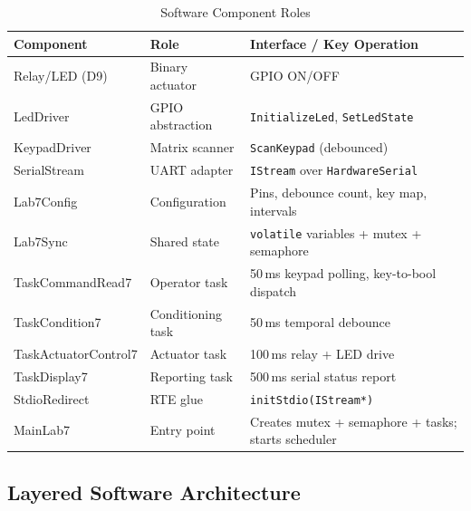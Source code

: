 \documentclass[12pt]{article}
\begin{document}
\begin{table}[H]
\centering
\begin{tabular}{@{}p{3.6cm}p{2.8cm}p{6.0cm}@{}}
\toprule
\textbf{Component} & \textbf{Role} & \textbf{Interface / Key Operation} \\
\midrule
Relay/LED (D9)     & Binary actuator    & GPIO ON/OFF \\
LedDriver          & GPIO abstraction   & \texttt{InitializeLed}, \texttt{SetLedState} \\
KeypadDriver       & Matrix scanner     & \texttt{ScanKeypad} (debounced) \\
SerialStream       & UART adapter       & \texttt{IStream} over \texttt{HardwareSerial} \\
Lab7Config         & Configuration      & Pins, debounce count, key map, intervals \\
Lab7Sync           & Shared state       & \texttt{volatile} variables + mutex + semaphore \\
TaskCommandRead7   & Operator task      & 50\,ms keypad polling, key-to-bool dispatch \\
TaskCondition7     & Conditioning task  & 50\,ms temporal debounce \\
TaskActuatorControl7 & Actuator task    & 100\,ms relay + LED drive \\
TaskDisplay7       & Reporting task     & 500\,ms serial status report \\
StdioRedirect      & RTE glue           & \texttt{initStdio(IStream*)} \\
MainLab7           & Entry point        & Creates mutex + semaphore + tasks; starts scheduler \\
\bottomrule
\end{tabular}
\caption{Software Component Roles}
\label{tab:components}
\end{table}

\subsection{Layered Software Architecture}
\end{document}
